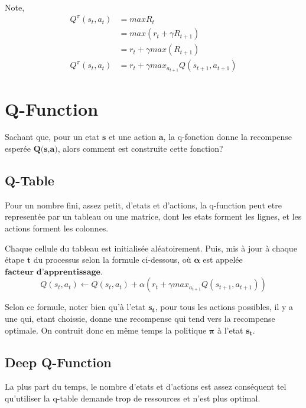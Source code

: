 \documentclass{article}
\begin{document}
Note,
\begin{equation}
\begin{split}
Q^{\pi}(s_t,a_t)&=maxR_t \\
&=max(r_t+{\gamma}R_{t+1}) \\
&=r_t+{\gamma}max(R_{t+1}) \\
Q^{\pi}(s_t,a_t)&=r_t+{\gamma}max_{a_{t+1}}{Q(s_{t+1},a_{t+1})}
\end{split}
\end{equation}

\section{Q-Function}

Sachant que, pour un etat $\textbf{s}$ et une action $\textbf{a}$, la q-fonction donne la recompense esperée $\textbf{Q(s,a)}$, alors comment est construite cette fonction? 

\subsection{Q-Table}

Pour un nombre fini, assez petit, d'etats et d'actions, la q-function peut etre representée par un tableau ou une matrice, dont les etats forment les lignes, et les actions forment les colonnes.
\newline

Chaque cellule du tableau est initialisée aléatoirement. Puis, mis à jour à chaque étape $\textbf{t}$ du processus selon la formule ci-dessous, où $\boldsymbol{\alpha}$ est appelée $\textbf{facteur d'apprentissage}$.
$$Q(s_t,a_t) \leftarrow Q(s_t,a_t) + \alpha (r_t+{\gamma}max_{a_{t+1}}{Q(s_{t+1},a_{t+1})})$$

Selon ce formule, noter bien qu'à l'etat $\boldsymbol{s_t}$, pour tous les actions possibles, il y a une qui, etant choissie, donne une recompense qui tend vers la recompense optimale. On contruit donc en même temps la politique $\boldsymbol{\pi}$ à l'etat $\boldsymbol{s_t}$.

\newpage

\subsection{Deep Q-Function}

La plus part du temps, le nombre d'etats et d'actions est assez conséquent tel qu'utiliser la q-table demande trop de ressources et n'est plus optimal.
\newline
\end{document}
